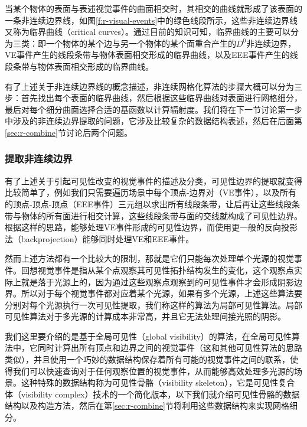 当某个物体的表面与表述视觉事件的曲面相交时，其相交的曲线就形成了该表面的一条非连续边界线，如图\ref{f:r-visual-events}中的绿色线段所示，这些非连续边界线又称为临界曲线（critical curves）。通过目前的知识可知，临界曲线的主要可以分为三类：即一个物体的某个边与另一个物体的某个面重合产生的$D^{0}$非连续边界，VE事件产生的线段条带与物体表面相交形成的临界曲线，以及EEE事件产生的线段条带与物体表面相交形成的临界曲线。

有了上述关于非连续边界线的概念描述，非连续网格化算法的步骤大概可以分为三步：首先找出每个表面的临界曲线，然后根据这些临界曲线对表面进行网格细分，最后对每个细分曲面选择合适的基函数以计算辐射度。我们将在下一节讨论第一步中涉及的非连续边界提取的问题，它涉及比较复杂的数据结构表述，然后在后面第\ref{sec:r-combine}节讨论后两个问题。




\subsubsection{提取非连续边界}\label{sec:r-critical-curves}
有了上述关于引起可见性改变的视觉事件的描述及分类，可见性边界的提取就变得比较简单了，例如我们只需要遍历场景中每个顶点-边界对（VE事件），以及所有的顶点-顶点-顶点（EEE事件）三元组以求出所有线段条带，让后再让这些线段条带与物体的所有面进行相交计算，这些线段条带与面的交线就构成了可见性边界。根据这样的思路，\cite{a:ADiscontinuityMeshingAlgorithmforAccurateRadiosity,a:DiscontinuityMeshingforRadiosity}能够处理VE事件形成的可见性边界，而\cite{a:Fastcomputationofshadowboundariesusingspatialcoherenceandbackprojections,a:AFastShadowAlgorithmforAreaLightSourcesUsingBackprojection}使用更一般的反向投影法（backprojection）能够同时处理VE和EEE事件。

然而上述方法都有一个比较大的限制，那就是它们只能每次处理单个光源的视觉事件。回想视觉事件是指从某个点观察其可见性拓扑结构发生的变化，这个观察点实际上就是落于光源上的，因为通过这些观察点观察到的可见性事件才会形成阴影边界。所以对于每个视觉事件都对应着某个光源，如果有多个光源，上述这些算法要分别对每个光源执行一次可见性提取，我们称这样的算法为局部可见性算法。局部可见性算法对于多光源的计算成本非常高，并且它无法处理间接光照的阴影。

我们这里要介绍的是基于全局可见性（global visibility）的算法，在全局可见性算法中，它同时计算出所有顶点和边界之间的视觉事件（这和其他可见性算法的思路类似），并且使用一个巧妙的数据结构保存着所有可能的视觉事件之间的联系，使得我们可以快速查询对于任何观察位置的视觉事件，从而能够高效处理多光源的场景。这种特殊的数据结构称为可见性骨骼（visibility skeleton）\cite{a:TheVisibilitySkeleton:APowerfulAndEfficientMulti-PurposeGlobalVisibilityTool}，它是可见性复合体（visibility complex）技术\cite{a:The3Dvisibilitycomplex:anewapproachtotheproblemsofaccuratevisibility}的一个简化版本，以下我们就介绍可见性骨骼的数据结构以及构造方法，然后在第\ref{sec:r-combine}节将利用这些数据结构来实现网格细分。




